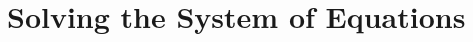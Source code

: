 \documentclass[11pt]{article}
\newcommand{\R}{\ensuremath{\mathbb{R}}}
\begin{document}
\section{Solving the System of Equations}\label{sec:solving-the-system}
%
%
\end{document}
